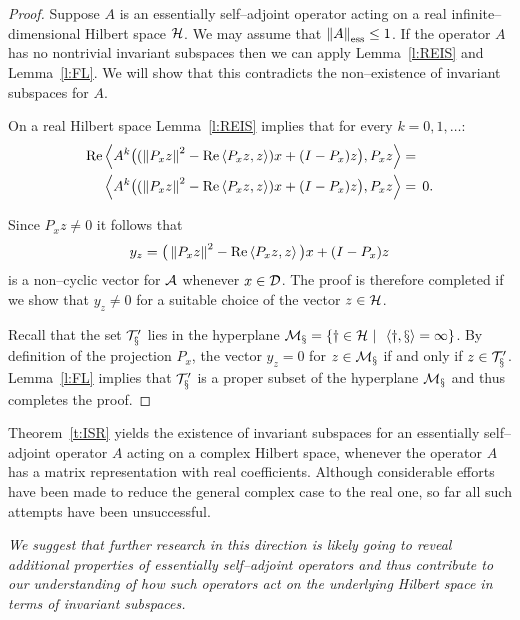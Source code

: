 \begin{proof}
Suppose $A$ is an essentially self--adjoint operator acting on a real
infinite--dimensional Hilbert space ${\cal H}$. We may assume that
$\essnorm{A}\leq1$. If the operator $A$ has no nontrivial invariant subspaces
then we can apply Lemma~\ref{l:REIS} and Lemma~\ref{l:FL}. We will show that
this contradicts the non--existence of invariant subspaces for $A$.

On a real Hilbert space Lemma~\ref{l:REIS} implies that for every
$k=0,1,\ldots$:
\begin{equation*}
  \begin{split}
     \operatorname{Re}\left<A^k\big((\left\Vert P_x z\right\Vert^2 - \operatorname{Re}\left<P_x z,z\right>)x + (I-P_x)z\big),
     P_x z\right> & = \\
        \left<A^k\big((\left\Vert P_x z\right\Vert^2 - \operatorname{Re}\left<P_x z,z\right>)x + (I-P_x)z\big),
     P_x z\right> & = \, 0.
  \end{split}
\end{equation*}

Since $P_x z\neq0$ it follows that
\begin{equation*}
   y_z = \big(\left\Vert P_x z\right\Vert^2 - \operatorname{Re}\left<P_x z,z\right>\big)x + (I-P_x)z
\end{equation*}
is a non--cyclic vector for ${\cal A}$ whenever $x\in{\cal{D}}$. The proof is therefore
completed if we show that $y_z\neq0$ for a suitable choice of the vector
$z\in{\cal H}$.

Recall that the set $\cal{T}'_x$ lies in the hyperplane
$\cal{M}_x=\left\{y\in{\cal H}\,\,|\,\,\,\left<y,x\right>=1\right\}$. By definition of the
projection $P_x$, the vector $y_z=0$ for $z\in\cal{M}_x$ if and only if
$z\in\cal{T}'_x$. Lemma~\ref{l:FL} implies that $\cal{T}'_x$ is a proper
subset of the hyperplane $\cal{M}_x$ and thus completes the proof.
\end{proof}

\smallskip

\begin{rem}
Theorem~\ref{t:ISR} yields the existence of invariant subspaces for an
essentially self--adjoint operator $A$ acting on a complex Hilbert space,
whenever the operator $A$ has a matrix representation with real coefficients.
Although considerable efforts have been made to reduce the general complex
case to the real one, so far all such attempts have been unsuccessful.
\end{rem}

\bigskip
\goodbreak

\emph{We suggest that further research in this direction is likely going to
reveal additional properties of essentially self--adjoint operators and thus
contribute to our understanding of how such operators act on the underlying
Hilbert space in terms of invariant subspaces.}

